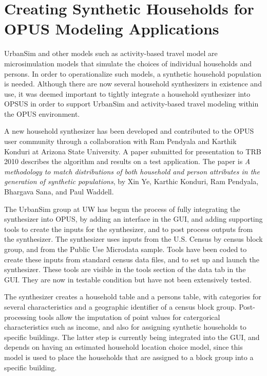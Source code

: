 \chapter{Creating Synthetic Households for OPUS Modeling Applications}

UrbanSim and other models such as activity-based travel model are microsimulation models that simulate the choices of individual households and persons.  In order to operationalize such models, a synthetic household population is needed.  Although there are now several household synthesizers in existence and use, it was deemed important to tightly integrate a household synthesizer into OPSUS in order to support UrbanSim and activity-based travel modeling within the OPUS environment.

A new household synthesizer has been developed and contributed to the OPUS user community through a collaboration with Ram Pendyala and Karthik Konduri at Arizona State University.  A paper submitted for presentation to TRB 2010 describes the algorithm and results on a test application. The paper is \emph{A methodology to match distributions of both household and person attributes in the generation of synthetic populations}, by Xin Ye, Karthic Konduri, Ram Pendyala, Bhargava Sana, and Paul Waddell. 

The UrbanSim group at UW has begun the process of fully integrating the synthesizer into OPUS, by adding an interface in the GUI, and adding supporting tools to create the inputs for the synthesizer, and to post process outputs from the synthesizer.  The synthesizer uses inputs from the U.S. Census by census block group, and from the Public Use Microdata sample.  Tools have been coded to create these inputs from standard census data files, and to set up and launch the synthesizer.  These tools are visible in the tools section of the data tab in the GUI.  They are now in testable condition but have not been extensively tested.

The synthesizer creates a household table and a persons table, with categories for several characteristics and a geographic identifier of a census block group.  Post-processing tools allow the imputation of point values for catergorical characteristics such as income, and also for assigning synthetic households to specific buildings.  The latter step is currently being integrated into the GUI, and depends on having an estimated household location choice model, since this model is used to place the households that are assigned to a block group into a specific building.

